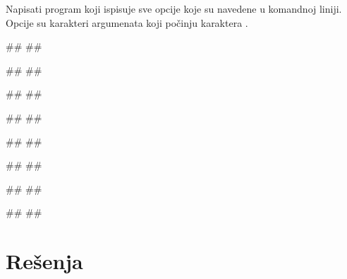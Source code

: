 \begin{Exercise}[label=v2.2_01] 
Napisati program koji ispisuje sve opcije koje su navedene u komandnoj liniji. Opcije su karakteri argumenata koji počinju karaktera \kckod{-}.
 
\begin{miditest}
\begin{upotreba}{1}
#\naslovPokretanje#
##

#\naslovIzlaz#
##
\end{upotreba}
\end{miditest}
\begin{miditest}
\begin{upotreba}{2}
#\naslovPokretanje#
##

#\naslovIzlaz#
##
\end{upotreba}
\end{miditest}

\begin{miditest}
\begin{upotreba}{3}
#\naslovPokretanje#
##

#\naslovIzlaz#
##
\end{upotreba}
\end{miditest}
\begin{miditest}
\begin{upotreba}{4}
#\naslovPokretanje#
##

#\naslovIzlaz#
##
\end{upotreba}
\end{miditest}

\end{Exercise}
\ifresenja
\begin{Answer}[ref=v2.2_01]
\end{Answer}
 \fi


\ifresenja
\section{Rešenja}
\shipoutAnswer
\fi
